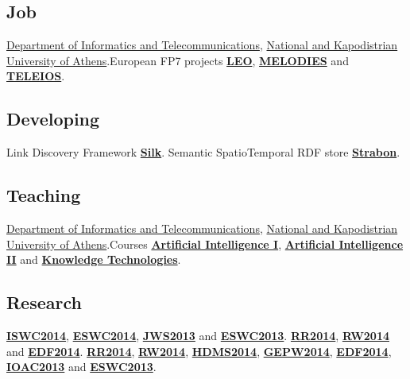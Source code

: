 \documentclass[11pt,a4paper,roman]{moderncv} %
\begin{document}
\subsection{Job}
{\href{http://www.di.uoa.gr/eng}{Department of Informatics and Telecommunications}, \href{http://en.uoa.gr}{National and Kapodistrian University of Athens}.}{European FP7 projects \textbf{\href{http://www.linkedeodata.eu}{LEO}}, \textbf{\href{http://www.melodiesproject.eu}{MELODIES}} and \textbf{\href{http://www.earthobservatory.eu}{TELEIOS}}.}

\subsection{Developing}
 {}{}{}{} {Link Discovery Framework \textbf{\href{http://silk.wbsg.de/}{Silk}}.}
 {}{}{}{} {Semantic SpatioTemporal RDF store \textbf{\href{http://strabon.di.uoa.gr}{Strabon}}.}

\subsection{Teaching}
{\href{http://www.di.uoa.gr/eng}{Department of Informatics and Telecommunications}, \href{http://en.uoa.gr}{National and Kapodistrian University of Athens}.}{Courses \textbf{\href{http://www.di.uoa.gr/~ys02}{Artificial Intelligence I}}, \textbf{\href{http://www.di.uoa.gr/~artint2}{Artificial Intelligence II}} and \textbf{\href{http://www.di.uoa.gr/~pms509}{Knowledge Technologies}}.}

\subsection{Research}
 {}{}{}{} {\textbf{\href{http://iswc2014.semanticweb.org/}{ISWC2014}}, \textbf{\href{http://2014.eswc-conferences.org/}{ESWC2014}}, \textbf{\href{http://www.journals.elsevier.com/journal-of-web-semantics/}{JWS2013}} and \textbf{\href{http://2013.eswc-conferences.org/}{ESWC2013}}.}
 {}{}{}{} {\textbf{\href{http://rr2014.di.uoa.gr/}{RR2014}}, \textbf{\href{http://rw2014.di.uoa.gr/}{RW2014}} and \textbf{\href{http://2014.data-forum.eu/}{EDF2014}}.}
 {}{}{}{} {\textbf{\href{http://rr2014.di.uoa.gr/}{RR2014}}, \textbf{\href{http://rw2014.di.uoa.gr/}{RW2014}}, \textbf{\href{http://hdms14.di.uoa.gr/index.php/en}{HDMS2014}}, \textbf{\href{http://www.gepw8.noa.gr/}{GEPW2014}}, \textbf{\href{http://2014.data-forum.eu/}{EDF2014}},  \textbf{\href{http://www.openaccess.gr/conferences/conference2013/?language_id=1}{IOAC2013}} and \textbf{\href{http://2013.eswc-conferences.org/}{ESWC2013}}.}
\end{document}
